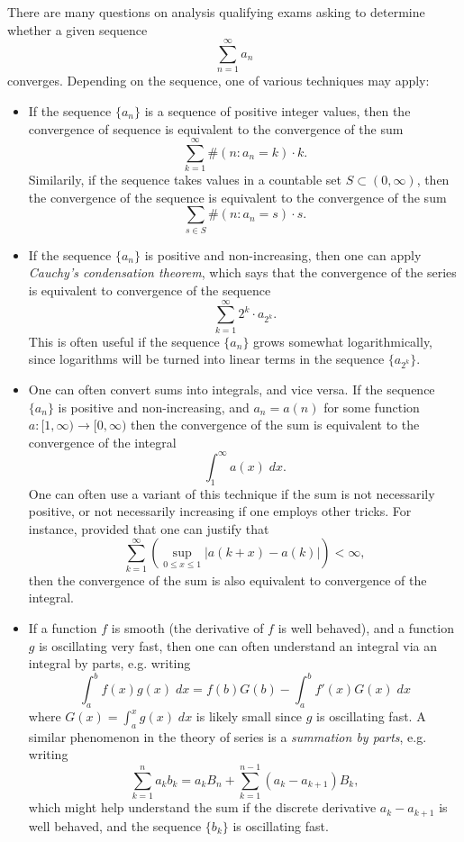 \documentclass{exam}
\theoremstyle{problemstyle}
\newcommand{\1}[1]{\textbf{1}_{\left[#1\right]}} %
\begin{document}
There are many questions on analysis qualifying exams asking to determine whether a given sequence
%
\[ \sum_{n = 1}^\infty a_n \]
%
converges. Depending on the sequence, one of various techniques may apply:
%
\begin{itemize}
	\item If the sequence $\{ a_n \}$ is a sequence of positive integer values, then the convergence of sequence is equivalent to the convergence of the sum
	\[ \sum_{k = 1}^\infty \#(n : a_n = k) \cdot k. \]
	Similarily, if the sequence takes values in a countable set $S \subset (0,\infty)$, then the convergence of the sequence is equivalent to the convergence of the sum
	\[ \sum_{s \in S} \#(n : a_n = s) \cdot s. \]

	\item If the sequence $\{ a_n \}$ is positive and non-increasing, then one can apply \emph{Cauchy's condensation theorem}, which says that the convergence of the series is equivalent to convergence of the sequence
	\[ \sum_{k = 1}^\infty 2^k \cdot a_{2^k}. \]
	This is often useful if the sequence $\{ a_n \}$ grows somewhat logarithmically, since logarithms will be turned into linear terms in the sequence $\{ a_{2^k} \}$.

	\item One can often convert sums into integrals, and vice versa. If the sequence $\{ a_n \}$ is positive and non-increasing, and $a_n = a(n)$ for some function $a: [1,\infty) \to [0,\infty)$ then the convergence of the sum is equivalent to the convergence of the integral
	\[ \int_1^\infty a(x)\; dx. \]
	One can often use a variant of this technique if the sum is not necessarily positive, or not necessarily increasing if one employs other tricks. For instance, provided that one can justify that
	\[ \sum_{k = 1}^\infty \left( \sup_{0 \leq x \leq 1} |a(k + x) - a(k)| \right) < \infty, \]
	then the convergence of the sum is also equivalent to convergence of the integral.

	\item If a function $f$ is smooth (the derivative of $f$ is well behaved), and a function $g$ is oscillating very fast, then one can often understand an integral via an integral by parts, e.g. writing
	\[ \int_a^b f(x) g(x)\; dx = f(b) G(b) - \int_a^b f'(x) G(x)\; dx \]
	where $G(x) = \int_a^x g(x)\; dx$ is likely small since $g$ is oscillating fast. A similar phenomenon in the theory of series is a \emph{summation by parts}, e.g. writing
	\[ \sum_{k = 1}^n a_k b_k = a_k B_n + \sum_{k = 1}^{n-1} (a_k - a_{k+1}) B_k, \]
	which might help understand the sum if the discrete derivative $a_k - a_{k+1}$ is well behaved, and the sequence $\{ b_k \}$ is oscillating fast.


\end{itemize}
\end{document}
